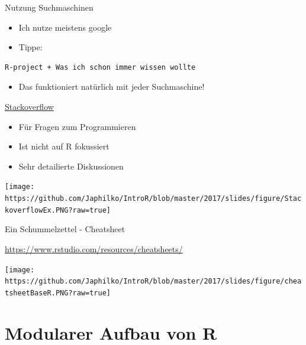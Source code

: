 \documentclass[
  ignorenonframetext,
]{beamer}
\providecommand{\tightlist}{%
  \setlength{\itemsep}{0pt}\setlength{\parskip}{0pt}}
\begin{document}
\begin{frame}[fragile]{Nutzung Suchmaschinen}
\protect\hypertarget{nutzung-suchmaschinen}{}

\begin{itemize}
\tightlist
\item
  Ich nutze meistens google
\item
  Tippe:
\end{itemize}

\begin{verbatim}
R-project + Was ich schon immer wissen wollte
\end{verbatim}

\begin{itemize}
\tightlist
\item
  Das funktioniert natürlich mit jeder Suchmaschine!
\end{itemize}

\end{frame}

\begin{frame}{\href{http://stackoverflow.com/}{Stackoverflow}}
\protect\hypertarget{stackoverflow}{}

\begin{itemize}
\tightlist
\item
  Für Fragen zum Programmieren
\item
  Ist nicht auf R fokussiert
\item
  Sehr detailierte Diskussionen
\end{itemize}

\texttt{[image: https://github.com/Japhilko/IntroR/blob/master/2017/slides/figure/StackoverflowEx.PNG?raw=true]}

\end{frame}

\begin{frame}{Ein Schummelzettel - Cheatsheet}
\protect\hypertarget{ein-schummelzettel---cheatsheet}{}

\url{https://www.rstudio.com/resources/cheatsheets/}

\texttt{[image: https://github.com/Japhilko/IntroR/blob/master/2017/slides/figure/cheatsheetBaseR.PNG?raw=true]}

\end{frame}

\hypertarget{modularer-aufbau-von-r}{%
\section{Modularer Aufbau von R}\label{modularer-aufbau-von-r}}
\end{document}
